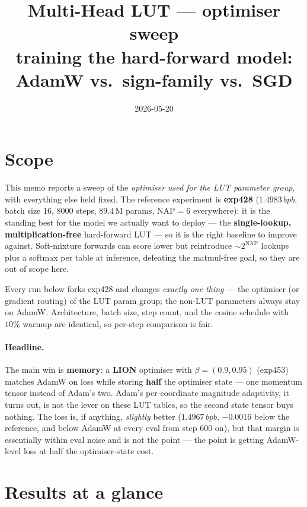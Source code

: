 \documentclass[11pt]{article}
\title{\textbf{Multi-Head LUT --- optimiser sweep\\
\large training the hard-forward model: AdamW vs.\ sign-family vs.\ SGD}}
\author{}
\date{2026-05-20}
\newcommand{\bpb}{\,bpb}
\begin{document}
\maketitle

\section*{Scope}

This memo reports a sweep of the \emph{optimiser used for the LUT
parameter group}, with everything else held fixed. The reference
experiment is \textbf{exp428} ($1.4983\bpb$, batch size $16$, $8000$ steps,
$89.4$\,M params, $\mathrm{NAP}=6$ everywhere): it is the standing best for
the model we actually want to deploy --- the \textbf{single-lookup,
multiplication-free} hard-forward LUT --- so it is the right baseline to
improve against. Soft-mixture forwards can score lower but reintroduce
$\sim\!2^{\mathrm{NAP}}$ lookups plus a softmax per table at inference,
defeating the matmul-free goal, so they are out of scope here.

Every run below forks exp428 and changes \emph{exactly one thing} --- the
optimiser (or gradient routing) of the LUT param group; the non-LUT
parameters always stay on AdamW. Architecture, batch size, step count, and
the cosine schedule with $10\%$ warmup are identical, so per-step
comparison is fair.

\paragraph{Headline.} The main win is \textbf{memory}: a \textbf{LION}
optimiser with $\beta=(0.9,0.95)$ (exp453) matches AdamW on loss while
storing \textbf{half} the optimiser state --- one momentum tensor instead
of Adam's two. Adam's per-coordinate magnitude adaptivity, it turns out, is
not the lever on these LUT tables, so the second state tensor buys nothing.
The loss is, if anything, \emph{slightly} better ($1.4967\bpb$, $-0.0016$
below the reference, and below AdamW at every eval from step $600$ on), but
that margin is essentially within eval noise and is not the point --- the
point is getting AdamW-level loss at half the optimiser-state cost.

\section{Results at a glance}
\end{document}
